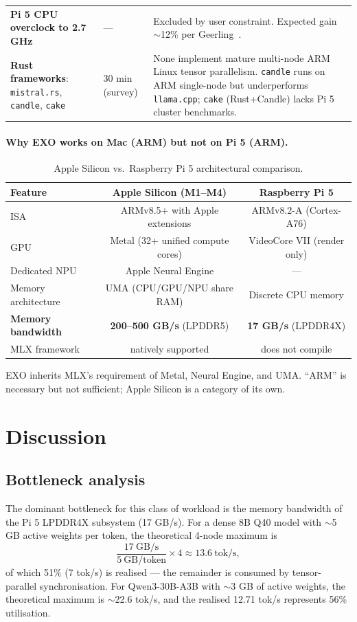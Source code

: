 \documentclass[11pt,a4paper]{article}
\begin{document}
\begin{table}[H]
\begin{tabular}{p{3.5cm}p{2cm}p{9cm}}
\textbf{Pi 5 CPU overclock to 2.7 GHz} & --- & Excluded by user constraint. Expected gain $\sim$12\% per Geerling~\cite{geerling2025}. \\
\textbf{Rust frameworks}: \texttt{mistral.rs}, \texttt{candle}, \texttt{cake} & 30 min (survey) & None implement mature multi-node ARM Linux tensor parallelism. \texttt{candle} runs on ARM single-node but underperforms \texttt{llama.cpp}; \texttt{cake} (Rust+Candle) lacks Pi 5 cluster benchmarks. \\
\bottomrule
\end{tabular}
\end{table}

\paragraph{Why EXO works on Mac (ARM) but not on Pi 5 (ARM).}

\begin{table}[H]
\centering
\caption{Apple Silicon vs.\ Raspberry Pi 5 architectural comparison.}
\begin{tabular}{lcc}
\toprule
\textbf{Feature} & \textbf{Apple Silicon (M1--M4)} & \textbf{Raspberry Pi 5} \\
\midrule
ISA & ARMv8.5+ with Apple extensions & ARMv8.2-A (Cortex-A76) \\
GPU & Metal (32+ unified compute cores) & VideoCore VII (render only) \\
Dedicated NPU & Apple Neural Engine & --- \\
Memory architecture & UMA (CPU/GPU/NPU share RAM) & Discrete CPU memory \\
\textbf{Memory bandwidth} & \textbf{200--500 GB/s} (LPDDR5) & \textbf{17 GB/s} (LPDDR4X) \\
MLX framework & natively supported & does not compile \\
\bottomrule
\end{tabular}
\end{table}

EXO inherits MLX's requirement of Metal, Neural Engine, and UMA. ``ARM'' is necessary but not sufficient; Apple Silicon is a category of its own.

\section{Discussion}

\subsection{Bottleneck analysis}
The dominant bottleneck for this class of workload is the memory bandwidth of the Pi 5 LPDDR4X subsystem (17 GB/s). For a dense 8B Q40 model with $\sim$5 GB active weights per token, the theoretical 4-node maximum is
\[
\frac{17~\text{GB/s}}{5~\text{GB/token}} \times 4 \approx 13.6~\text{tok/s},
\]
of which 51\% (7 tok/s) is realised --- the remainder is consumed by tensor-parallel synchronisation. For Qwen3-30B-A3B with $\sim$3 GB of active weights, the theoretical maximum is $\sim$22.6 tok/s, and the realised 12.71 tok/s represents 56\% utilisation.
\end{document}
